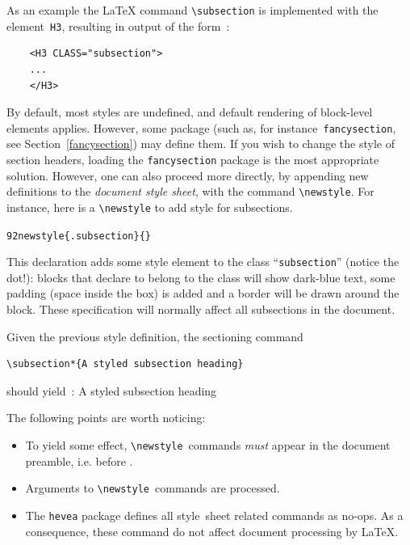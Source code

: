 As an example the \LaTeX{} command \verb+\subsection+
 is implemented with the element~\verb+H3+, resulting in
\html{} output of the form~:
\begin{verbatim}
    <H3 CLASS="subsection">
    ...
    </H3>
\end{verbatim}
By default, most styles are undefined, and default rendering of
block-level elements applies. However, some package (such as, for
instance~\texttt{fancysection}, see Section~\ref{fancysection}) may
define them.
%
If you wish to change the style of section headers, loading the
\texttt{fancysection} package is the most appropriate solution.
However, one can also proceed more directly, by appending new
definitions to the \emph{document style
sheet}, with the command \verb+\newstyle+.
For instance, here is a \verb+\newstyle+ to add style for subsections.
\begin{alltt}
  \char92newstyle\{.subsection\}\{\stylex\}
\end{alltt}
This declaration adds some style element to the class
``\texttt{subsection}'' (notice the dot!):
blocks that declare to belong to the class
will show dark-blue text, some padding
(space inside the box) is added and a border will be drawn around the block.
These specification will normally affect all subsections in the document.
\begin{htmlonly}
Given the previous style definition, the sectioning command
\begin{verbatim}
\subsection*{A styled subsection heading}
\end{verbatim}
should yield~:
A styled subsection heading
\end{htmlonly}

The following points are worth noticing:
\begin{itemize}
\item
To yield some effect, \verb+\newstyle+~commands \emph{must} appear
in the document preamble, i.e. before \verb++.
\item
Arguments to \verb+\newstyle+~commands are processed.
\item The \texttt{hevea} package defines all style~sheet related
commands as no-ops. As a consequence, these command do not affect
document processing by \LaTeX{}.
\end{itemize}




